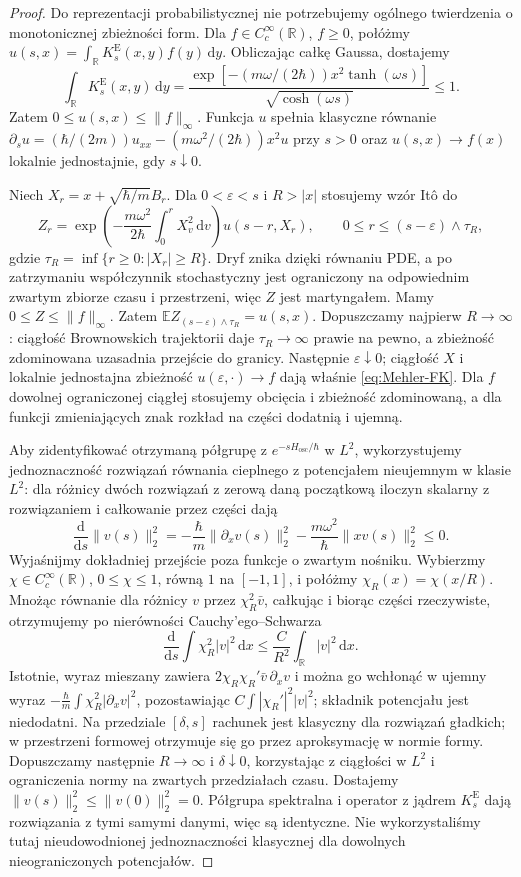 \documentclass[11pt,a4paper,oneside]{report}
\numberwithin{equation}{chapter}
\theoremstyle{plain}
\theoremstyle{definition}
\theoremstyle{remark}
\newcommand{\R}{\mathbb{R}}
\newcommand{\E}{\mathbb{E}}
\newcommand{\dd}{\mathrm{d}}
\begin{document}
\begin{proof}
Do reprezentacji probabilistycznej nie potrzebujemy
ogólnego twierdzenia o monotonicznej zbieżności form.
Dla $f\in C_c^\infty(\R)$, $f\ge0$, połóżmy
$u(s,x)=\int_{\R}K_s^{\mathrm E}(x,y)f(y)\,\dd y$.
Obliczając całkę Gaussa, dostajemy
\[
 \int_{\R} K_s^{\mathrm E}(x,y)\,\dd y
 =\frac{\exp[-(m\omega/(2\hbar))x^2\tanh(\omega s)]}
        {\sqrt{\cosh(\omega s)}}\le1.
\]
Zatem $0\le u(s,x)\le\|f\|_\infty$.
Funkcja $u$ spełnia klasyczne równanie
$\partial_su=(\hbar/(2m))u_{xx}-(m\omega^2/(2\hbar))x^2u$
przy $s>0$ oraz $u(s,x)\to f(x)$ lokalnie jednostajnie,
gdy $s\downarrow0$.

Niech $X_r=x+\sqrt{\hbar/m}B_r$. Dla
$0<\varepsilon<s$ i $R>|x|$ stosujemy wzór Itô do
\[
 Z_r=\exp\left(-\frac{m\omega^2}{2\hbar}
 \int_0^rX_v^2\,\dd v\right)u(s-r,X_r),
 \qquad 0\le r\le(s-\varepsilon)\wedge\tau_R,
\]
gdzie $\tau_R=\inf\{r\ge0:|X_r|\ge R\}$.
Dryf znika dzięki równaniu PDE, a po zatrzymaniu
współczynnik stochastyczny jest ograniczony na
odpowiednim zwartym zbiorze czasu i przestrzeni,
więc $Z$ jest martyngałem. Mamy $0\le Z\le\|f\|_\infty$.
Zatem $\E Z_{(s-\varepsilon)\wedge\tau_R}=u(s,x)$.
Dopuszczamy najpierw $R\to\infty$: ciągłość Brownowskich
trajektorii daje $\tau_R\to\infty$ prawie na pewno,
a zbieżność zdominowana uzasadnia przejście do granicy.
Następnie $\varepsilon\downarrow0$; ciągłość $X$ i
lokalnie jednostajna zbieżność $u(\varepsilon,\cdot)\to f$
dają właśnie \eqref{eq:Mehler-FK}.
Dla $f$ dowolnej ograniczonej ciągłej stosujemy obcięcia
i zbieżność zdominowaną, a dla funkcji zmieniających znak
rozkład na części dodatnią i ujemną.

Aby zidentyfikować otrzymaną półgrupę z
$e^{-sH_{\mathrm{osc}}/\hbar}$ w $L^2$, wykorzystujemy
jednoznaczność rozwiązań równania cieplnego z
potencjałem nieujemnym w klasie $L^2$: dla różnicy
dwóch rozwiązań z zerową daną początkową iloczyn skalarny
z rozwiązaniem i całkowanie przez części dają
\[
 \frac{\dd}{\dd s}\|v(s)\|_2^2
 =-\frac{\hbar}{m}\|\partial_xv(s)\|_2^2
  -\frac{m\omega^2}{\hbar}\|xv(s)\|_2^2\le0.
\]
Wyjaśnijmy dokładniej przejście poza funkcje o zwartym
nośniku. Wybierzmy $\chi\in C_c^\infty(\R)$, $0\le\chi\le1$,
równą $1$ na $[-1,1]$, i połóżmy $\chi_R(x)=\chi(x/R)$.
Mnożąc równanie dla różnicy $v$ przez $\chi_R^2\bar v$,
całkując i biorąc części rzeczywiste, otrzymujemy po
nierówności Cauchy'ego--Schwarza
\[
\frac{\dd}{\dd s}\int\chi_R^2|v|^2\,\dd x
\le \frac{C}{R^2}\int_{\R}|v|^2\,\dd x.
\]
Istotnie, wyraz mieszany zawiera
$2\chi_R\chi_R'\bar v\,\partial_xv$ i można go
wchłonąć w ujemny wyraz
$-\frac{\hbar}{m}\int\chi_R^2|\partial_xv|^2$,
pozostawiając $C\int|\chi_R'|^2|v|^2$;
składnik potencjału jest niedodatni. Na przedziale
$[\delta,s]$ rachunek jest klasyczny dla rozwiązań
gładkich; w przestrzeni formowej otrzymuje się go przez
aproksymację w normie formy. Dopuszczamy następnie
$R\to\infty$ i $\delta\downarrow0$, korzystając z
ciągłości w $L^2$ i ograniczenia normy na zwartych
przedziałach czasu. Dostajemy
$\|v(s)\|_2^2\le\|v(0)\|_2^2=0$.
Półgrupa spektralna i operator z jądrem $K_s^{\mathrm E}$
dają rozwiązania z tymi samymi danymi, więc są identyczne.
Nie wykorzystaliśmy tutaj nieudowodnionej jednoznaczności
klasycznej dla dowolnych nieograniczonych potencjałów.
\end{proof}
\end{document}
